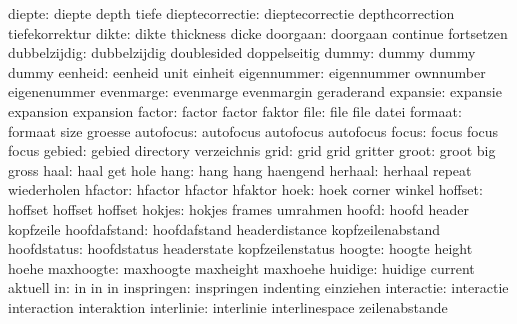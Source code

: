               diepte:  diepte               depth                tiefe
     dieptecorrectie:  dieptecorrectie      depthcorrection      tiefekorrektur
               dikte:  dikte                thickness            dicke
            doorgaan:  doorgaan             continue             fortsetzen
        dubbelzijdig:  dubbelzijdig         doublesided          doppelseitig
               dummy:  dummy                dummy                dummy
             eenheid:  eenheid              unit                 einheit
         eigennummer:  eigennummer          ownnumber            eigenenummer
           evenmarge:  evenmarge            evenmargin           geraderand
            expansie:  expansie             expansion            expansion
              factor:  factor               factor               faktor
                file:  file                 file                 datei
             formaat:  formaat              size                 groesse
           autofocus:  autofocus            autofocus            autofocus 
               focus:  focus                focus                focus 
              gebied:  gebied               directory            verzeichnis
                grid:  grid                 grid                 gritter
               groot:  groot                big                  gross
                haal:  haal                 get                  hole
                hang:  hang                 hang                 haengend
             herhaal:  herhaal              repeat               wiederholen  %
             hfactor:  hfactor              hfactor              hfaktor
                hoek:  hoek                 corner               winkel
             hoffset:  hoffset              hoffset              hoffset
              hokjes:  hokjes               frames               umrahmen
               hoofd:  hoofd                header               kopfzeile
        hoofdafstand:  hoofdafstand         headerdistance       kopfzeilenabstand
         hoofdstatus:  hoofdstatus          headerstate          kopfzeilenstatus
              hoogte:  hoogte               height               hoehe
           maxhoogte:  maxhoogte            maxheight            maxhoehe
             huidige:  huidige              current              aktuell
                  in:  in                   in                   in
          inspringen:  inspringen           indenting            einziehen
          interactie:  interactie           interaction          interaktion
          interlinie:  interlinie           interlinespace       zeilenabstande
